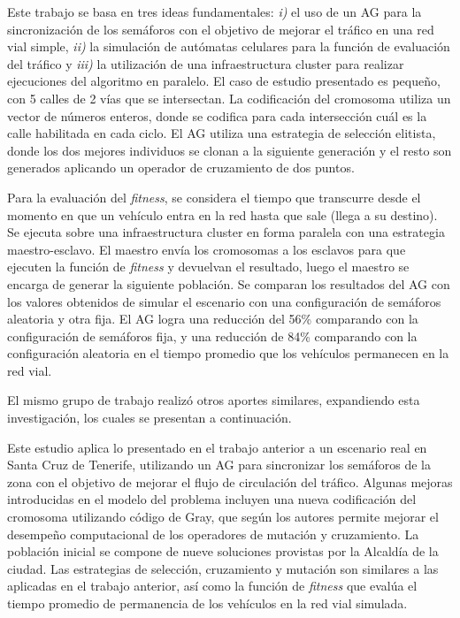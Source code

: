 \begin{itemize}
\begin{item}

Este trabajo se basa en tres ideas fundamentales:  \textit{i)} el uso de un AG para la sincronización de los semáforos con el objetivo de mejorar el tráfico en una red vial simple,  \textit{ii)} la simulación de autómatas celulares para la función de evaluación del tráfico y \textit{iii)} la utilización de una infraestructura cluster para realizar ejecuciones del algoritmo en paralelo.
El caso de estudio presentado es pequeño, con 5 calles de 2 vías que se intersectan. La codificación del cromosoma utiliza un vector de números enteros, donde se codifica para cada intersección cuál es la calle habilitada en cada ciclo. El AG utiliza una estrategia de selección elitista, donde los dos mejores individuos se clonan a la siguiente generación y el resto son generados aplicando un operador de cruzamiento de dos puntos.

Para la evaluación del \emph{fitness}, se considera el tiempo que transcurre desde el momento en que un vehículo entra en la red hasta que sale (llega a su destino). Se ejecuta sobre una infraestructura cluster en forma paralela con una estrategia maestro-esclavo. El maestro envía los cromosomas a los esclavos para que ejecuten la función de \emph{fitness} y devuelvan el resultado, luego el maestro se encarga de generar la siguiente población.
Se comparan los resultados del AG con los valores obtenidos de simular el escenario con una configuración de semáforos aleatoria y otra fija. El AG logra una reducción del 56\% comparando con la configuración de semáforos fija, y una reducción de 84\% comparando con la configuración aleatoria en el tiempo promedio que los vehículos permanecen en la red vial. 
	
El mismo grupo de trabajo realizó otros aportes similares, expandiendo esta investigación, los cuales se presentan a continuación.
\end{item}
	
\begin{item}

Este estudio aplica lo presentado en el trabajo anterior a un escenario real en Santa Cruz de Tenerife, utilizando un AG para sincronizar los semáforos de la zona con el objetivo de mejorar el flujo de circulación del tráfico. Algunas mejoras introducidas en el modelo del problema incluyen una nueva codificación del cromosoma utilizando código de Gray, que según los autores permite mejorar el desempeño computacional de los operadores de mutación y cruzamiento. La población inicial se compone de nueve soluciones provistas por la Alcaldía de la ciudad. Las estrategias de selección, cruzamiento y mutación son similares a las aplicadas en el trabajo anterior, así como la función de \emph{fitness} que evalúa el tiempo promedio de permanencia de los vehículos en la red vial simulada.


\end{item}
\end{itemize}
